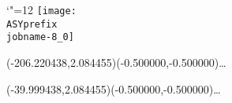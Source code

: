 \setlength{\unitlength}{1pt}%
\makeatletter%
\let\ASYencoding\f@encoding%
\let\ASYfamily\f@family%
\let\ASYseries\f@series%
\let\ASYshape\f@shape%
\makeatother%
{\catcode`"=12%
\texttt{[image: \\ASYprefix\\jobname-8\_0]}%
}%
%
\fontsize{12.000000}{14.400000}\selectfont%
\usefont{\ASYencoding}{\ASYfamily}{\ASYseries}{\ASYshape}%
\ASYalign(-206.220438,2.084455)(-0.500000,-0.500000){\ldots}%
%
\fontsize{12.000000}{14.400000}\selectfont%
\ASYalign(-39.999438,2.084455)(-0.500000,-0.500000){\ldots}%
